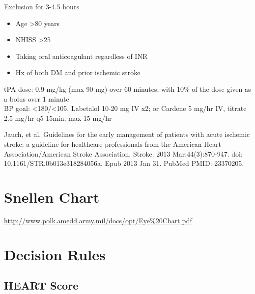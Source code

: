 \documentclass[8pt]{extarticle}
\begin{document}
Exclusion for 3-4.5 hours
\begin{itemize}
    \item Age >80 years
    \item NHISS >25
    \item Taking oral anticoagulant regardless of INR
    \item Hx of both DM and prior ischemic stroke
\end{itemize}
tPA dose: 0.9 mg/kg (max 90 mg) over 60 minutes, with 10\% of the dose given as a bolus over 1 minute\\
BP goal: <180/<105. Labetalol 10-20 mg IV x2; or Cardene 5 mg/hr IV, titrate 2.5 mg/hr q5-15min, max 15 mg/hr

\vfill

\tiny{Jauch, et al. Guidelines for the early management of patients with acute ischemic stroke: a guideline for healthcare professionals from the American Heart Association/American Stroke Association. Stroke. 2013 Mar;44(3):870-947. doi: 10.1161/STR.0b013e318284056a. Epub 2013 Jan 31. PubMed PMID: 23370205.}
\newpage
\section{Snellen Chart}


\url{http://www.polk.amedd.army.mil/docs/opt/Eye%20Chart.pdf}

\section{Decision Rules}

\subsection{HEART Score}
\end{document}
